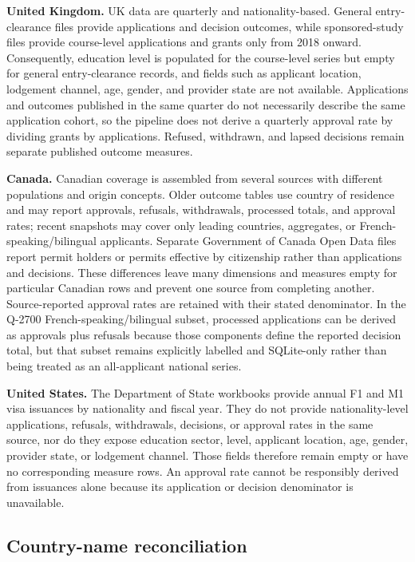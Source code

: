 \documentclass[runningheads]{llncs}
\begin{document}
\textbf{United Kingdom.} UK data are quarterly and nationality-based. General entry-clearance files provide applications and decision outcomes, while sponsored-study files provide course-level applications and grants only from 2018 onward. Consequently, education level is populated for the course-level series but empty for general entry-clearance records, and fields such as applicant location, lodgement channel, age, gender, and provider state are not available. Applications and outcomes published in the same quarter do not necessarily describe the same application cohort, so the pipeline does not derive a quarterly approval rate by dividing grants by applications. Refused, withdrawn, and lapsed decisions remain separate published outcome measures.

\textbf{Canada.} Canadian coverage is assembled from several sources with different populations and origin concepts. Older outcome tables use country of residence and may report approvals, refusals, withdrawals, processed totals, and approval rates; recent snapshots may cover only leading countries, aggregates, or French-speaking/bilingual applicants. Separate Government of Canada Open Data files report permit holders or permits effective by citizenship rather than applications and decisions. These differences leave many dimensions and measures empty for particular Canadian rows and prevent one source from completing another. Source-reported approval rates are retained with their stated denominator. In the Q-2700 French-speaking/bilingual subset, processed applications can be derived as approvals plus refusals because those components define the reported decision total, but that subset remains explicitly labelled and SQLite-only rather than being treated as an all-applicant national series.

\textbf{United States.} The Department of State workbooks provide annual F1 and M1 visa issuances by nationality and fiscal year. They do not provide nationality-level applications, refusals, withdrawals, decisions, or approval rates in the same source, nor do they expose education sector, level, applicant location, age, gender, provider state, or lodgement channel. Those fields therefore remain empty or have no corresponding measure rows. An approval rate cannot be responsibly derived from issuances alone because its application or decision denominator is unavailable.

\subsection{Country-name reconciliation}
\end{document}
